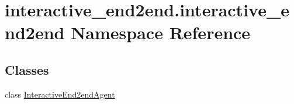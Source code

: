 \hypertarget{namespaceinteractive__end2end_1_1interactive__end2end}{}\section{interactive\+\_\+end2end.\+interactive\+\_\+end2end Namespace Reference}
\label{namespaceinteractive__end2end_1_1interactive__end2end}
\subsection*{Classes}
\begin{DoxyCompactItemize}
\item 
class \hyperlink{classinteractive__end2end_1_1interactive__end2end_1_1InteractiveEnd2endAgent}{Interactive\+End2end\+Agent}
\end{DoxyCompactItemize}
